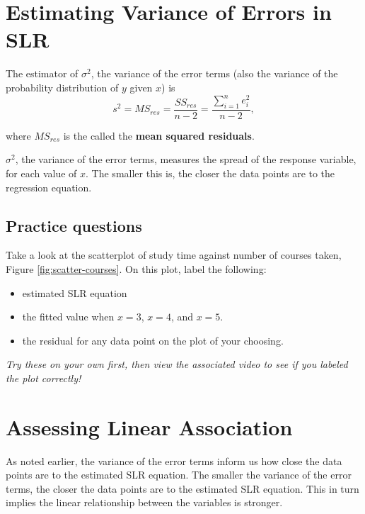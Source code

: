 \documentclass[
]{book}
\providecommand{\tightlist}{%
  \setlength{\itemsep}{0pt}\setlength{\parskip}{0pt}}
\begin{document}
\hypertarget{estimating-variance-of-errors-in-slr}{%
\section{Estimating Variance of Errors in SLR}\label{estimating-variance-of-errors-in-slr}}

The estimator of \(\sigma^2\), the variance of the error terms (also the variance of the probability distribution of \(y\) given \(x\)) is
\begin{equation} 
s^2 = MS_{res} = \frac{SS_{res}}{n-2} = \frac{\sum\limits_{i=1}^n e_i^2}{n-2},
\label{eq:variance}
\end{equation}

where \(MS_{res}\) is the called the \textbf{mean squared residuals}.

\(\sigma^2\), the variance of the error terms, measures the spread of the response variable, for each value of \(x\). The smaller this is, the closer the data points are to the regression equation.

\hypertarget{practice-questions-1}{%
\subsection{Practice questions}\label{practice-questions-1}}

Take a look at the scatterplot of study time against number of courses taken, Figure \ref{fig:scatter-courses}. On this plot, label the following:

\begin{itemize}
\tightlist
\item
  estimated SLR equation
\item
  the fitted value when \(x=3\), \(x=4\), and \(x=5\).
\item
  the residual for any data point on the plot of your choosing.
\end{itemize}

\emph{Try these on your own first, then view the associated video to see if you labeled the plot correctly!}

\hypertarget{assessing-linear-association}{%
\section{Assessing Linear Association}\label{assessing-linear-association}}

As noted earlier, the variance of the error terms inform us how close the data points are to the estimated SLR equation. The smaller the variance of the error terms, the closer the data points are to the estimated SLR equation. This in turn implies the linear relationship between the variables is stronger.
\end{document}
